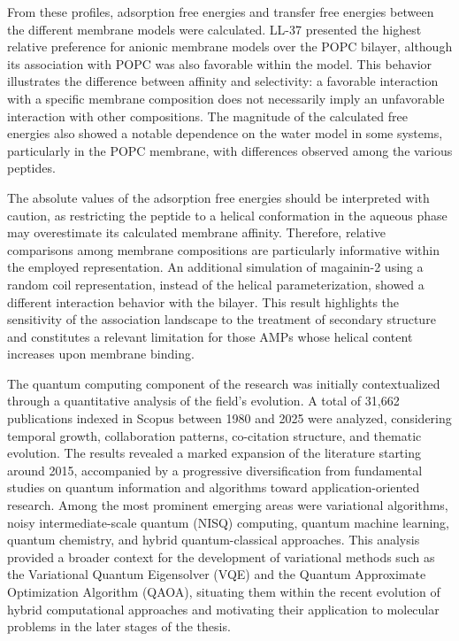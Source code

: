 From these profiles, adsorption free energies and transfer free energies between the different membrane models were calculated. LL-37 presented the highest relative preference for anionic membrane models over the POPC bilayer, although its association with POPC was also favorable within the model. This behavior illustrates the difference between affinity and selectivity: a favorable interaction with a specific membrane composition does not necessarily imply an unfavorable interaction with other compositions. The magnitude of the calculated free energies also showed a notable dependence on the water model in some systems, particularly in the POPC membrane, with differences observed among the various peptides.

The absolute values of the adsorption free energies should be interpreted with caution, as restricting the peptide to a helical conformation in the aqueous phase may overestimate its calculated membrane affinity. Therefore, relative comparisons among membrane compositions are particularly informative within the employed representation. An additional simulation of magainin-2 using a random coil representation, instead of the helical parameterization, showed a different interaction behavior with the bilayer. This result highlights the sensitivity of the association landscape to the treatment of secondary structure and constitutes a relevant limitation for those AMPs whose helical content increases upon membrane binding.

The quantum computing component of the research was initially contextualized through a quantitative analysis of the field's evolution. A total of 31,662 publications indexed in Scopus between 1980 and 2025 were analyzed, considering temporal growth, collaboration patterns, co-citation structure, and thematic evolution. The results revealed a marked expansion of the literature starting around 2015, accompanied by a progressive diversification from fundamental studies on quantum information and algorithms toward application-oriented research. Among the most prominent emerging areas were variational algorithms, noisy intermediate-scale quantum (NISQ) computing, quantum machine learning, quantum chemistry, and hybrid quantum-classical approaches. This analysis provided a broader context for the development of variational methods such as the Variational Quantum Eigensolver (VQE) and the Quantum Approximate Optimization Algorithm (QAOA), situating them within the recent evolution of hybrid computational approaches and motivating their application to molecular problems in the later stages of the thesis.

